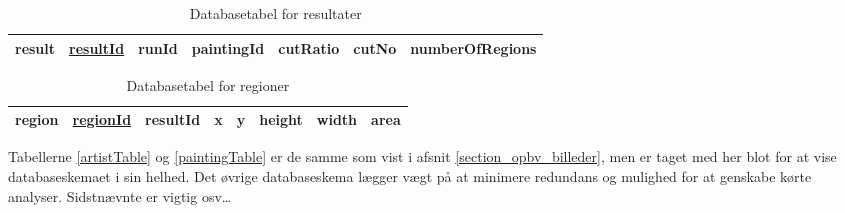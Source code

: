 {\begin{table}[!h]
    \centering
    \begin{tabular}{|l||c|c|c|c|c|c|}
        \hline
        \bf{result} \hspace{0.5cm} & \underline{resultId} & runId & paintingId & cutRatio & cutNo & numberOfRegions \\\hline
    \end{tabular}
    \caption{Databasetabel for resultater}
    \label{resultTable}
\end{table}

\begin{table}[!h]
    \centering
    \begin{tabular}{|l||c|c|c|c|c|c|c|}
        \hline
        \bf{region} \hspace{0.5cm} & \underline{regionId} & resultId & x & y & height & width & area \\\hline
    \end{tabular}
    \caption{Databasetabel for regioner}
    \label{regionTable}
\end{table}

Tabellerne \ref{artistTable} og \ref{paintingTable} er de samme som vist
i afsnit \ref{section_opbv_billeder}, men er taget med her blot for at
vise databaseskemaet i sin helhed. Det øvrige databaseskema lægger vægt
på at minimere redundans og mulighed for at genskabe kørte analyser.
Sidstnævnte er vigtig osv\dots

}
